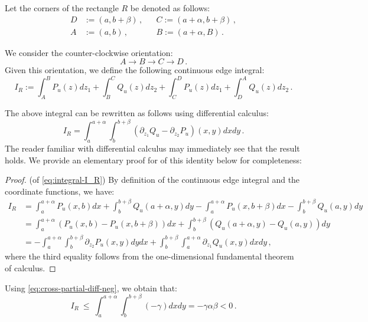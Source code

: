 \documentclass[a4paper,11pt,fullpage]{article}
\theoremstyle{plain}
\theoremstyle{definition}
\theoremstyle{plain}
\renewcommand{\leq}{~\le~}
\begin{document}
Let the corners of the rectangle $R$ be denoted as follows: 
\begin{align*}
D &:= (a, b + \beta)\,, && C:= (a+\alpha, b+ \beta)\,,\\
A &:= (a,b)\,,  && B:= (a+ \alpha, B)\,.
\end{align*}

We consider the counter-clockwise orientation: 
\begin{equation*}
A \to B \to C \to D\,.
\end{equation*}
Given this orientation, we define the following continuous edge integral: 
\begin{equation}
\label{eq:def-integral-I_R}
I_R := \int_A^B P_u(z) dz_1 + \int_B^C Q_u(z) dz_2 + \int_C^D P_u(z) dz_1 + \int_D^A Q_u(z) dz_2\,.
\end{equation}

The above integral can be rewritten as follows using differential calculus: 
\begin{equation}
\label{eq:integral-I_R}
    I_R = \int_a^{a + \alpha} \int_b^{b+\beta} (\partial_{z_1} Q_u - \partial_{z_2} P_u)(x,y) dx dy\,.
\end{equation}
The reader familiar with differential calculus may immediately see that the result holds. We provide an elementary proof for of this identity below for completeness:  
\begin{proof}
(of \eqref{eq:integral-I_R})
By definition of the continuous edge integral and the coordinate functions, we have: 
\begin{align}
I_R &= \int_a^{a + \alpha} P_u(x,b) dx + \int_b^{b + \beta} Q_u(a + \alpha, y) dy - \int_a^{a+ \alpha} P_u(x,b+\beta) dx - \int_b^{b+\beta} Q_u(a,y) dy \nonumber\\
&= \int_a^{a+\alpha} (P_u(x,b) - P_u(x,b+\beta))dx + \int_b^{b+\beta} (Q_u(a+\alpha,y) - Q_u(a,y))dy \nonumber\\
&= - \int_a^{a+\alpha} \int_b^{b+\beta} \partial_{z_2} P_u(x,y) dy dx + \int_b^{b+\beta} \int_a^{a+\alpha} \partial_{z_1}Q_u(x,y) dx dy\,,
\end{align} 
where the third equality follows from the one-dimensional fundamental theorem of calculus. 
\end{proof}

Using \eqref{eq:cross-partial-diff-neg}, we obtain that: 
\begin{equation}
\label{eq:rect-integral-neg-bound}
I_R \leq \int_a^{a + \alpha} \int_b^{b+\beta} (-\gamma) dx dy = - \gamma \alpha \beta < 0\,.
\end{equation}
\end{document}
